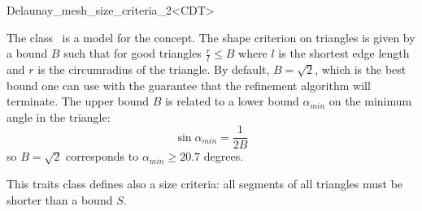\begin{ccRefClass}{Delaunay_mesh_size_criteria_2<CDT>}

\ccDefinition
  
The class \ccRefName\ is a model for the  concept.
The shape criterion on triangles is given by a bound $B$ such that for good
triangles $\frac{r}{l} \le B$ where $l$ is the shortest edge length
and $r$ is the circumradius of the triangle.  By default, $B=\sqrt{2}$,
which is the best bound one can use with the guarantee that the refinement
algorithm will terminate. The upper bound $B$ is related to a lower bound
$\alpha_{min}$ on the minimum angle in the triangle:
\begin{displaymath}
  \sin{ \alpha_{min} } = \frac{1}{2 B}
\end{displaymath}
so $B=\sqrt{2}$ corresponds to  $\alpha_{min} \ge 20.7$ degrees.

This traits class defines also a size criteria: all segments of all
triangles must be shorter than a bound $S$.


\ccIsModel


\ccCreation
{}

\end{ccRefClass}

